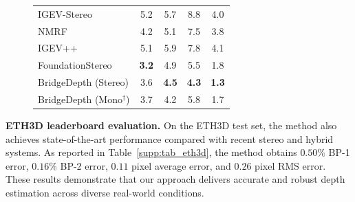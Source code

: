 \begin{figure}[!t]
\begin{minipage}{0.54\linewidth}
{\begin{tabular}{l c c c c}
			IGEV-Stereo~\cite{xu2023iterative} &5.2 & 5.7 & 8.8 & 4.0\\
			NMRF~\cite{guan2024neural} & 4.2 & 5.1 & 7.5 & 3.8\\
			IGEV++~\cite{xu2024igev++} & 5.1 & 5.9 & 7.8 & 4.1 \\
			FoundationStereo~\cite{wen2025foundationstereo} & \cellcolor{red!25}\textbf{3.2} & \cellcolor{yellow!25}4.9 & \cellcolor{yellow!25}5.5 & \cellcolor{yellow!25}1.8 \\
			\midrule
			BridgeDepth (Stereo) & \cellcolor{yellow!25}3.6 & \cellcolor{red!25}\textbf{4.5} & \cellcolor{red!25}\textbf{4.3} & \cellcolor{red!25}\textbf{1.3}\\
			BridgeDepth (Mono$^\dag$) & 3.7 & 4.2 & 5.8 & 1.7\\
			\bottomrule
		\end{tabular}
		}
		\label{tab:bridge_zero_shot}
	\end{minipage}
\end{figure}

\noindent\textbf{ETH3D leaderboard evaluation.} On the ETH3D test set, the method also achieves state-of-the-art performance compared with recent stereo and hybrid systems.
As reported in Table~\ref{supp:tab_eth3d}, the method obtains $0.50\%$ BP-1 error, $0.16\%$ BP-2 error, $0.11$ pixel average error, and $0.26$ pixel RMS error.
These results demonstrate that our approach delivers accurate and robust depth estimation across diverse real-world conditions.

